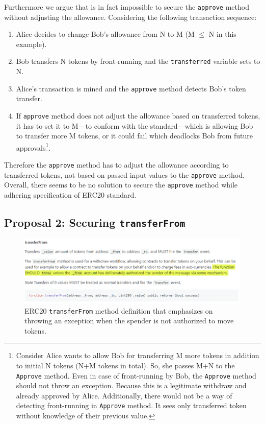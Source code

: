 Furthermore we argue that is in fact impossible to secure the \texttt{approve} method without adjusting the allowance. Considering the following transaction sequence:

\begin{enumerate}
	\item Alice decides to change Bob's allowance from N to M (M $\leq$ N in this example).
	\item Bob transfers N tokens by front-running and the \texttt{transferred} variable sets to N.
	\item Alice's transaction is mined and the \texttt{approve} method detects Bob's token transfer.
	\item If \texttt{approve} method does not adjust the allowance based on transferred tokens, it has to set it to M---to conform with the standard---which is allowing Bob to transfer more M tokens, or it could fail which deadlocks Bob from future approvals\footnote{Consider Alice wants to allow Bob for transferring M more tokens in addition to initial N tokens (N+M tokens in total). So, she passes M+N to the \texttt{Approve} method. Even in case of front-running by Bob, the \texttt{Approve} method should not throw an exception. Because this is a legitimate withdraw and already approved by Alice. Additionally, there would not be a way of detecting front-running in \texttt{Approve} method. It sees only transferred token without knowledge of their previous value.}.
\end{enumerate}

Therefore the \texttt{approve} method has to adjust the allowance according to transferred tokens, not based on passed input values to the \texttt{approve} method. Overall, there seems to be no solution to secure the \texttt{approve} method while adhering specification of ERC20 standard.



\subsection{Proposal 2: Securing \texttt{transferFrom}}\label{sec:proposal2}

\begin{figure}[t]
	\centering
	\includegraphics[width=1.0\linewidth]{figures/multiple_withdrawal_30.png}
	\caption{ERC20 \texttt{transferFrom} method definition that emphasizes on throwing an exception when the spender is not authorized to move tokens.\label{fig:standard}}
\end{figure}


